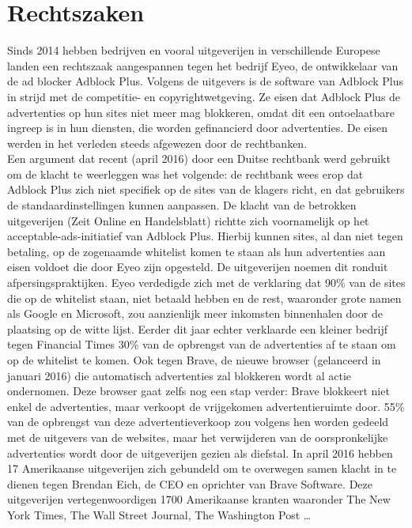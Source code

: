 \documentclass[pdftex,a4paper,12pt,twoside]{report}
\begin{document}
\section{Rechtszaken}
\label{sec Rechtszaken}
Sinds 2014 hebben bedrijven en vooral uitgeverijen in verschillende Europese landen een rechtszaak aangespannen tegen het bedrijf Eyeo, de ontwikkelaar van de ad blocker Adblock Plus. Volgens de uitgevers is de software van Adblock Plus in strijd met de competitie- en copyrightwetgeving. Ze eisen dat Adblock Plus de advertenties op hun sites niet meer mag blokkeren, omdat dit een ontoelaatbare ingreep is in hun diensten, die worden gefinancierd door advertenties. 
De eisen werden in het verleden steeds afgewezen door de rechtbanken. 
\\
Een argument dat recent (april 2016) door een Duitse rechtbank werd gebruikt om de klacht te weerleggen was het volgende: de rechtbank wees erop dat Adblock Plus zich niet specifiek op de sites van de klagers richt, en dat gebruikers de standaardinstellingen kunnen aanpassen. De klacht van de betrokken uitgeverijen (Zeit Online en Handelsblatt) richtte zich voornamelijk op het acceptable-ads-initiatief van Adblock Plus. Hierbij kunnen sites, al dan niet tegen betaling, op de zogenaamde whitelist komen te staan als hun advertenties aan eisen voldoet die door Eyeo zijn opgesteld. De uitgeverijen noemen dit ronduit afpersingspraktijken.
Eyeo verdedigde zich met de verklaring dat 90\% van de sites die op de whitelist staan, niet betaald hebben en de rest, waaronder grote namen als Google en Microsoft, zou aanzienlijk meer inkomsten binnenhalen door de plaatsing op de witte lijst. 
Eerder dit jaar echter verklaarde een kleiner bedrijf tegen Financial Times 30\% van de opbrengst van de advertenties af te staan om op de whitelist te komen.
Ook tegen Brave, de nieuwe browser (gelanceerd in januari 2016) die automatisch advertenties zal blokkeren wordt al actie ondernomen. Deze browser gaat zelfs nog een stap verder: Brave blokkeert niet enkel de advertenties, maar verkoopt de vrijgekomen advertentieruimte door. 55\% van de opbrengst van deze advertentieverkoop zou volgens hen worden gedeeld met de uitgevers van de websites, maar het verwijderen van de oorspronkelijke advertenties wordt door de uitgeverijen gezien als diefstal.
In april 2016 hebben 17 Amerikaanse uitgeverijen zich gebundeld om te overwegen samen klacht in te dienen tegen Brendan Eich, de CEO en oprichter van Brave Software. Deze uitgeverijen vertegenwoordigen 1700 Amerikaanse kranten waaronder The New York Times, The Wall Street Journal, The Washington Post …
\end{document}
